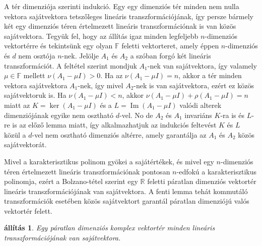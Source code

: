 \documentclass[9pt, a4paper, showtrims]{memoir}
\makeatletter
\renewenvironment{proof}[1][\proofname]
    {\par\pushQED{\qed}%
    \normalfont \topsep6\p@\@plus6\p@\relax
    \trivlist
    \item[\hskip\labelsep
        \itshape
    #1\@addpunct{:}]\ignorespaces}
    {\popQED\endtrivlist\@endpefalse}
\theoremstyle{plain}
\newtheorem{proposition}{állítás}[chapter]
\theoremstyle{remark}
\theoremstyle{definition}
\DeclareMathOperator{\im}{Im}
\makeatother
\begin{document}
\begin{proof}
    A tér dimenziója szerinti indukció.
    Egy egy dimenziós tér minden nem nulla vektora sajátvektora tetszőleges lineáris transzformációjának,
    így persze bármely két egy dimenziós téren értelmezett lineáris transzformációnak is van közös
    sajátvektora.
    Tegyük fel, 
    hogy az állítás igaz minden legfeljebb $n$-dimenziós vektortérre
    és tekintsünk egy olyan $\mathbb{F}$ feletti vektorteret, 
    amely éppen $n$-dimenziós és $d$ nem osztója $n$-nek.
    Jelölje $A_1$ és $A_2$ a szóban forgó két lineáris transzformációt.
    A feltétel szerint mondjuk $A_1$-nek van sajátvektora, 
    így valamely $\mu\in\mathbb{F}$ mellett 
    $\nu\left( A_1-\mu I \right)>0.$
    Ha az 
    $\nu\left( A_1-\mu I \right)=n$, akkor a tér minden vektora sajátvektora $A_1$-nek,
    így mivel $A_2$-nek is van sajátvektora, ezért ez közös sajátvektoruk is.
    Ha 
    $\nu\left( A_1-\mu I \right)<n$, akkor 
    $\nu\left( A_1-\mu I \right)+\rho\left( A_1-\mu I \right)=n$ miatt az
    $K=\ker\left( A_1-\mu I \right)$ és a 
    $L=\im\left( A_1-\mu I \right)$ 
    valódi alterek dimenziójának egyike nem osztható $d$-vel.
    No de $A_2$ és $A_1$ invariáns $K$-ra is és $L$-re is
    az előző lemma miatt, 
    így alkalmazhatjuk az indukciós feltevést $K$ és $L$ közül 
    a $d$-vel nem osztható dimenziós altérre,
    amely garantálja az $A_1$ és $A_2$ közös sajátvektorát.
\end{proof}

Mivel a karakterisztikus polinom gyökei a sajátértékek, és mivel egy $n$-dimenziós
téren értelmezett lineáris transzformációnak pontosan $n$-edfokú a karakterisztikus polinomja,
ezért a Bolzano-tétel szerint egy $\mathbb{R}$ feletti páratlan dimenziós vektortér lineáris transzformációjának van sajátvektora. 
A fenti lemma tehát kommutáló transzformációk esetében közös sajátvektort garantál 
páratlan dimenziójú valós vektortér felett.

\begin{proposition}
    Egy páratlan dimenziós komplex vektortér 
    minden lineáris transzformációjának van sajátvektora.
\end{proposition}
\end{document}
